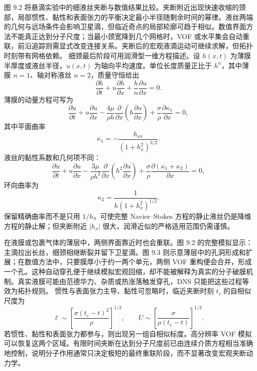 \documentclass[11pt,a4paper,openany,fontset=none]{ctexbook}
\begin{document}
图 9.2 将悬滴实验中的细液丝夹断与数值结果比较。夹断附近出现快速收缩的颈部，局部惯性、黏性和表面张力的平衡决定最小半径随剩余时间的幂律。液丝两端的几何与远场条件会影响卫星滴，但临近奇点的局部轮廓可趋于相似。数值界面方法不能真正达到分子尺度；当最小颈宽降到几个网格时，VOF 或水平集会自动重联，前沿追踪则需显式改变连接关系。夹断后的宏观液滴运动可继续求解，但拓扑时刻带有网格依赖。
细颈最后阶段可用润滑型一维方程描述。设 $h(x,t)$ 为薄膜半厚度或液丝半径，$u(x,t)$ 为轴向平均速度。单位长度质量正比于 $h^n$，其中薄膜 $n=1$、轴对称液丝 $n=2$，质量守恒给出
\begin{equation}
 \frac{\partial h}{\partial t}
 +u\frac{\partial h}{\partial x}
 +\frac{h}{n}\frac{\partial u}{\partial x}=0.
 \tag{9.1}
\end{equation}
薄膜的动量方程可写为
\begin{equation}
 \frac{\partial u}{\partial t}+u\frac{\partial u}{\partial x}
 -\frac{4\mu}{\rho h}\frac{\partial}{\partial x}
 \left(h\frac{\partial u}{\partial x}\right)
 +\frac{\sigma}{\rho}\frac{\partial\kappa_1}{\partial x}=0,
 \tag{9.2}
\end{equation}
其中平面曲率
\begin{equation}
 \kappa_1=-\frac{h_{xx}}{(1+h_x^2)^{3/2}}.
 \tag{9.3}
\end{equation}
液丝的黏性系数和几何项不同：
\begin{equation}
 \frac{\partial u}{\partial t}+u\frac{\partial u}{\partial x}
 -\frac{3\mu}{\rho h^2}\frac{\partial}{\partial x}
 \left(h^2\frac{\partial u}{\partial x}\right)
 +\frac{\sigma}{\rho}\frac{\partial(\kappa_1+\kappa_2)}{\partial x}=0,
 \tag{9.4}
\end{equation}
环向曲率为
\begin{equation}
 \kappa_2=\frac{1}{h(1+h_x^2)^{1/2}}.
 \tag{9.5}
\end{equation}
保留精确曲率而不是只用 $1/h$，可使完整 Navier--Stokes 方程的静止液丝仍是降维方程的静止解；但夹断附近 $|h_x|$ 很大，润滑近似的严格适用范围仍需谨慎。

在液膜或包裹气体的薄层中，两侧界面靠近时也会重联。图 9.2 的完整模拟显示：主滴拉出长丝，细颈相继断裂并留下卫星滴。图 9.3 则示意薄层中的孔洞形成和扩展；在数值方法中，只要膜厚小于约一两个单元，两侧 VOF 重构便会合并，形成一个孔。这种自动穿孔便于继续模拟宏观回缩，却不能被解释为真实的分子破膜机制。真实液膜可能由范德华力、杂质或热涨落触发穿孔，DNS 只能把这些过程等效为拓扑规则。
惯性与表面张力主导、黏性可忽略时，临近夹断时刻 $t_c$ 的自相似尺度为
\begin{equation}
 \ell\sim\left[\frac{\sigma(t_c-t)^2}{\rho}\right]^{1/3},
 \qquad
 U\sim\left[\frac{\sigma}{\rho(t_c-t)}\right]^{1/3}.
\end{equation}
若惯性、黏性和表面张力都参与，则出现另一组自相似标度。高分辨率 VOF 模拟可以恢复这两个区域。有限时间夹断在达到分子尺度前已由连续介质方程相当准确地控制，说明分子作用通常只决定极短的最终重联阶段，而不显著改变宏观夹断动力学。
\end{document}
